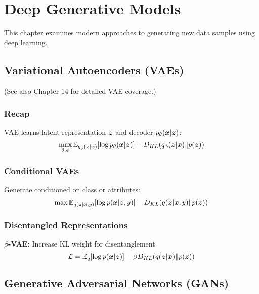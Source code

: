 
\chapter{Deep Generative Models}
\label{chap:deep-generative-models}

This chapter examines modern approaches to generating new data samples using deep learning.

\section{Variational Autoencoders (VAEs)}
\label{sec:vaes}

(See also Chapter 14 for detailed VAE coverage.)

\subsection{Recap}

VAE learns latent representation $\boldsymbol{z}$ and decoder $p_{\theta}(\boldsymbol{x}|\boldsymbol{z})$:
\begin{equation}
\max_{\theta, \phi} \mathbb{E}_{q_{\phi}(\boldsymbol{z}|\boldsymbol{x})}[\log p_{\theta}(\boldsymbol{x}|\boldsymbol{z})] - D_{KL}(q_{\phi}(\boldsymbol{z}|\boldsymbol{x}) \| p(\boldsymbol{z}))
\end{equation}

\subsection{Conditional VAEs}

Generate conditioned on class or attributes:
\begin{equation}
\max \mathbb{E}_{q(\boldsymbol{z}|\boldsymbol{x}, y)}[\log p(\boldsymbol{x}|\boldsymbol{z}, y)] - D_{KL}(q(\boldsymbol{z}|\boldsymbol{x}, y) \| p(\boldsymbol{z}))
\end{equation}

\subsection{Disentangled Representations}

\textbf{$\beta$-VAE:} Increase KL weight for disentanglement
\begin{equation}
\mathcal{L} = \mathbb{E}_{q}[\log p(\boldsymbol{x}|\boldsymbol{z})] - \beta D_{KL}(q(\boldsymbol{z}|\boldsymbol{x}) \| p(\boldsymbol{z}))
\end{equation}

\section{Generative Adversarial Networks (GANs)}
\label{sec:gans}

